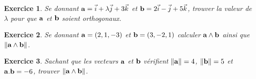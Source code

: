 \documentclass[12pt]{article}
\newtheorem{exercice}{\bf Exercice}
\newtheorem{correction}{\bf Correction exercice}
\newenvironment{exo}{
\begin{exercice}\smallskip\normalfont}{\end{exercice}
}
\newenvironment{cor}{
\begin{correction}\smallskip\normalfont}{\end{correction}
}
\newcommand{\I}{{ \vec{i}}}
\newcommand{\J}{{ \vec{j}}}
\newcommand{\K}{{ \vec{k}}}
\newif\ifcorrige\corrigefalse
\begin{document}
\begin{exo} Se donnant ${\bf a}=\I+\lambda \J+3\K$ et ${\bf b}=2\I-\J+5\K$, trouver la valeur de $\lambda$ pour que ${\bf a}$ et $\bf b$ soient orthogonaux.
\end{exo}
\ifcorrige
\color{magenta}
\begin{cor}
  $\qquad$ 
  On a ${\bf a}.{\bf b}=0$ ssi $2-2\lambda+15=0$ et donc $\lambda=17/2$.
\end{cor}
\color{black}
\fi
\begin{exo} Se donnant ${\bf a}=(2,1,-3)$ et ${\bf b}=(3,-2,1)$ calculer ${\bf a}\wedge {\bf b}$ ainsi que $\Vert {\bf a}\wedge {\bf b} \Vert$.
\end{exo}
\ifcorrige
\color{magenta}
\begin{cor}
  $\qquad$ 
  La m\'ethode usuelle des produits en croix donne ${\bf a}\wedge {\bf b}=(-5,-11,-7)$, puis on a 
  $ \Vert {\bf a}\wedge {\bf b} \Vert^2=195$.
\end{cor}
\color{black}
\fi

\begin{exo}
Sachant que les vecteurs $\bf a$ et $\bf b$ v\'erifient $\Vert {\bf a}\Vert=4$, $\Vert {\bf b}\Vert=5$ et ${\bf a}.{\bf b}=-6$, trouver $\Vert {\bf a}\wedge {\bf b} \Vert$.
\end{exo}
\ifcorrige
\color{magenta}
\begin{cor}
  $\qquad$ 
  
  On sait que $${\bf a}\wedge {\bf b}=\Vert {\bf a }\Vert \Vert {\bf b }\Vert \sin(\theta) \vec{n},$$
  o\`u $\vec{n}$ est le vecteur directement orthonormal au plan (orient\'e) d\'efini par les vecteurs ${\bf a},{\bf b}$, et o\`u $\theta$ est l'angle entre ${\bf a},{\bf b}$.
  On a donc
  $$\Vert  {\bf a}\wedge {\bf b} \Vert= 20 \vert \sin \theta \vert.$$
  Mais 
  $$\cos\theta =\frac{{\bf a }.{\bf b}}{ \Vert {\bf a} \Vert \Vert {\bf b} \Vert}=-3/10.$$
  En utilisant $\cos^2 \theta+\sin^2\theta=1$, on a
  $$ \vert \sin \theta \vert=\sqrt{1-9/100}=\frac{\sqrt{91}}{10},$$
  d'o\`u
  $$ \Vert  {\bf a}\wedge {\bf b} \Vert=2\sqrt{91}.$$
  On peut aussi interpr\'eter $  \Vert  {\bf a}\wedge {\bf b} \Vert$ comme l'aire du parall\'elogramme d\'efini par ${\bf a},{\bf b}$.
\end{cor}
\color{black}
\fi
\end{document}
